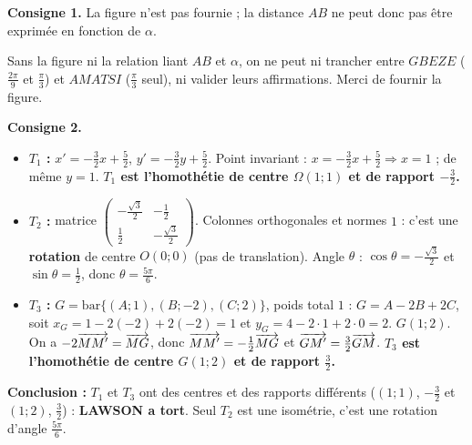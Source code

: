 \textbf{Consigne 1.} La figure n'est pas fournie ; la distance $AB$ ne peut donc pas \^etre exprim\'ee en fonction de $\alpha$.
\begin{rem} Sans la figure ni la relation liant $AB$ et $\alpha$, on ne peut ni trancher entre $GBEZE$ ($\frac{2\pi}{9}$ et $\frac{\pi}{3}$) et
$AMATSI$ ($\frac{\pi}{3}$ seul), ni valider leurs affirmations. Merci de fournir la figure.\end{rem}

\textbf{Consigne 2.}
\begin{itemize}
  \item \textbf{$T_1$ :} $x'=-\frac32x+\frac52$, $y'=-\frac32y+\frac52$. Point invariant : $x=-\frac32x+\frac52\Rightarrow x=1$ ;
  de m\^eme $y=1$. \textbf{$T_1$ est l'homoth\'etie de centre $\Omega(1;1)$ et de rapport $-\frac32$.}
  \item \textbf{$T_2$ :} matrice $\begin{pmatrix}-\frac{\sqrt3}{2}&-\frac12\\ \frac12&-\frac{\sqrt3}{2}\end{pmatrix}$.
  Colonnes orthogonales et normes $1$ : c'est une \textbf{rotation} de centre $O(0;0)$ (pas de translation).
  Angle $\theta$ : $\cos\theta=-\frac{\sqrt3}{2}$ et $\sin\theta=\frac12$, donc \textbf{$\theta=\frac{5\pi}{6}$}.
  \item \textbf{$T_3$ :} $G=\mathrm{bar}\{(A;1),(B;-2),(C;2)\}$, poids total $1$ : $G=A-2B+2C$, soit
  $x_G=1-2(-2)+2(-2)=1$ et $y_G=4-2\cdot1+2\cdot0=2$.
  \textbf{$G(1;2)$}. On a $-2\overrightarrow{MM'}=\overrightarrow{MG}$, donc $\overrightarrow{MM'}=-\frac12\overrightarrow{MG}$ et $\overrightarrow{GM'}=\frac32\overrightarrow{GM}$.
  \textbf{$T_3$ est l'homoth\'etie de centre $G(1;2)$ et de rapport $\frac32$.}
\end{itemize}
\textbf{Conclusion :} $T_1$ et $T_3$ ont des centres et des rapports diff\'erents ($(1;1)$, $-\frac32$ et $(1;2)$, $\frac32$) :
\textbf{LAWSON a tort}. Seul $T_2$ est une isom\'etrie, c'est une rotation d'angle $\frac{5\pi}{6}$.
